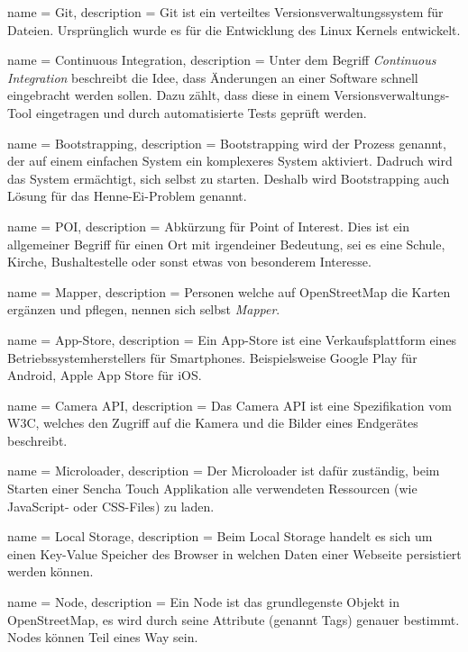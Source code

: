  {
	name = Git,
	description = {Git ist ein verteiltes Versionsverwaltungssystem für Dateien. Ursprünglich wurde es für die Entwicklung des Linux Kernels entwickelt.}
}

 {
	name = Continuous Integration,
	description = {Unter dem Begriff \emph{Continuous Integration}\cite{cont-integration} beschreibt die Idee, dass Änderungen an einer Software schnell eingebracht werden sollen. Dazu zählt, dass diese in einem Versionsverwaltungs-Tool eingetragen und durch automatisierte Tests geprüft werden.}
}

 {
	name = Bootstrapping,
	description = {Bootstrapping wird der Prozess genannt, der auf einem einfachen System ein komplexeres System aktiviert\cite{bootstrapping}. Dadruch wird das System ermächtigt, sich selbst zu starten. Deshalb wird Bootstrapping auch Lösung für das Henne-Ei-Problem genannt.}
}

 {
	name = POI,
	description = {Abkürzung für Point of Interest. Dies ist ein allgemeiner Begriff für einen Ort mit irgendeiner Bedeutung, sei es eine Schule, Kirche, Bushaltestelle oder sonst etwas von besonderem Interesse.}
}

 {
	name = Mapper,
	description = {Personen welche auf OpenStreetMap die Karten ergänzen und pflegen, nennen sich selbst \emph{Mapper}.}
}

 {
	name = App-Store,
	description = {Ein App-Store ist eine Verkaufsplattform eines Betriebssystemherstellers für Smartphones. Beispielsweise Google Play für Android, Apple App Store für iOS.}
}

 {
	name = Camera API,
	description = {Das Camera API ist eine Spezifikation vom W3C\cite{camera-api}, welches den Zugriff auf die Kamera und die Bilder eines Endgerätes beschreibt.}
}

 {
	name = Microloader,
	description = {Der Microloader ist dafür zuständig, beim Starten einer Sencha Touch Applikation alle verwendeten Ressourcen (wie JavaScript- oder CSS-Files) zu laden.}
}

 {
	name = Local Storage,
	description = {Beim Local Storage handelt es sich um einen Key-Value Speicher des Browser in welchen Daten einer Webseite persistiert werden können.}
}

 {
	name = Node,
	description = {Ein Node ist das grundlegenste Objekt in OpenStreetMap, es wird durch seine Attribute (genannt \glspl{Tag}) genauer bestimmt. Nodes können Teil eines \gls{Way} sein.}
}

